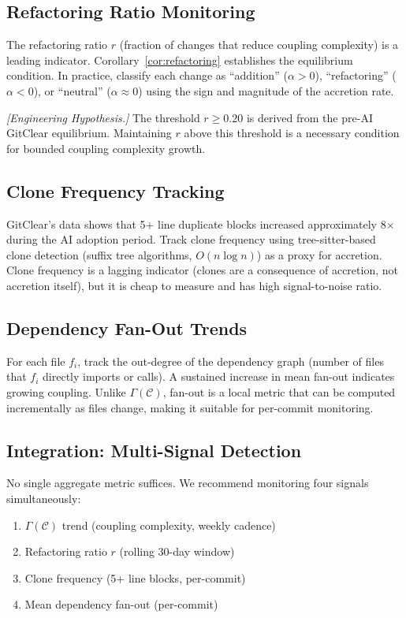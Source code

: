 \documentclass[11pt, a4paper, copyright]{googledeepmind}
\begin{document}
\subsection{Refactoring Ratio Monitoring}

The refactoring ratio $r$ (fraction of changes that reduce coupling complexity) is a leading indicator. Corollary~\ref{cor:refactoring} establishes the equilibrium condition. In practice, classify each change as ``addition'' ($\alpha > 0$), ``refactoring'' ($\alpha < 0$), or ``neutral'' ($\alpha \approx 0$) using the sign and magnitude of the accretion rate.

\emph{[Engineering Hypothesis.]} The threshold $r \geq 0.20$ is derived from the pre-AI GitClear equilibrium. Maintaining $r$ above this threshold is a necessary condition for bounded coupling complexity growth.

\subsection{Clone Frequency Tracking}

GitClear's data shows that 5+ line duplicate blocks increased approximately 8$\times$ during the AI adoption period. Track clone frequency using tree-sitter-based clone detection (suffix tree algorithms, $O(n \log n)$) as a proxy for accretion. Clone frequency is a lagging indicator (clones are a consequence of accretion, not accretion itself), but it is cheap to measure and has high signal-to-noise ratio.

\subsection{Dependency Fan-Out Trends}

For each file $f_i$, track the out-degree of the dependency graph (number of files that $f_i$ directly imports or calls). A sustained increase in mean fan-out indicates growing coupling. Unlike $\Gamma(\mathcal{C})$, fan-out is a local metric that can be computed incrementally as files change, making it suitable for per-commit monitoring.

\subsection{Integration: Multi-Signal Detection}

No single aggregate metric suffices. We recommend monitoring four signals simultaneously:

\begin{enumerate}[nosep]
    \item $\Gamma(\mathcal{C})$ trend (coupling complexity, weekly cadence)
    \item Refactoring ratio $r$ (rolling 30-day window)
    \item Clone frequency (5+ line blocks, per-commit)
    \item Mean dependency fan-out (per-commit)
\end{enumerate}
\end{document}
